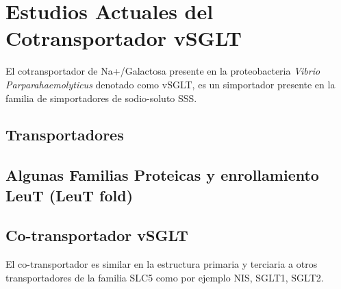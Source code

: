\chapter{Estudios Actuales del Cotransportador vSGLT}
El cotransportador de Na+/Galactosa presente en la proteobacteria \textit{Vibrio Parparahaemolyticus } denotado como vSGLT, es un simportador presente en la familia de simportadores de sodio-soluto SSS.
\section{Transportadores}
\section{Algunas Familias Proteicas y enrollamiento LeuT (LeuT fold)}
\section{Co-transportador vSGLT}
El co-transportador es similar en la estructura primaria y terciaria a otros transportadores de la familia SLC5 como por ejemplo NIS, SGLT1, SGLT2.